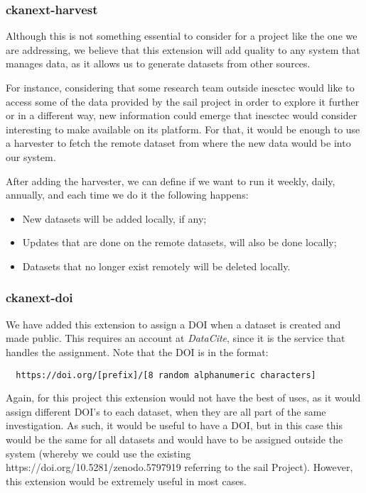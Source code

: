   \subsubsection{ckanext-harvest}
  
  Although this is not something essential to consider for a project like the one we are addressing, we believe that this extension will add quality to any system that manages data, as it allows us to generate datasets from other sources.

  For instance, considering that some research team outside \gls{inesctec} would like to access some of the data provided by the \gls{sail} project in order to explore it further or in a different way, new information could emerge that \gls{inesctec} would consider interesting to make available on its platform. For that, it would be enough to use a harvester to fetch the remote dataset from where the new data would be into our system.
  
  After adding the harvester, we can define if we want to run it weekly, daily, annually, and each time we do it the following happens:
  
  \begin{itemize}
      \item New datasets will be added locally, if any;
      \item Updates that are done on the remote datasets, will also be done locally;
      \item Datasets that no longer exist remotely will be deleted locally.
  \end{itemize}
  
  \subsubsection{ckanext-doi}
  
  We have added this extension to assign a DOI when a dataset is created and made public. This requires an account at \textit{DataCite}, since it is the service that handles the assignment. Note that the DOI is in the format:
  
  \begin{verbatim}
  https://doi.org/[prefix]/[8 random alphanumeric characters]
  \end{verbatim}
  
  Again, for this project this extension would not have the best of uses, as it would assign different DOI's to each dataset, when they are all part of the same investigation. As such, it would be useful to have a DOI, but in this case this would be the same for all datasets and would have to be assigned outside the system (whereby we could use the existing https://doi.org/10.5281/zenodo.5797919 referring to the \gls{sail} Project). However, this extension would be extremely useful in most cases.
  
